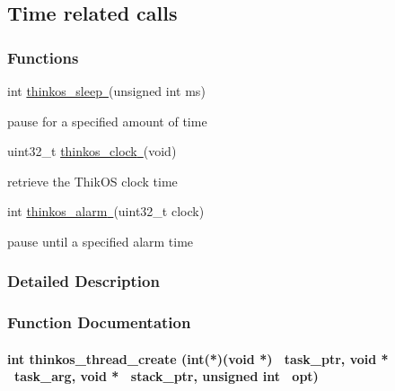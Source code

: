 \subsection{\texorpdfstring{{Time related
calls}}{Time related calls}}\label{h.fj4n6rp8qwm7}

\subsubsection{\texorpdfstring{{Functions}}{Functions}}\label{h.iqcme3p75udy}

{int
}{\protect\hyperlink{h.26in1rg}{thinkos\_sleep}}{\protect\hyperlink{h.26in1rg}{~}}{(unsigned
int ms)}

{pause for a specified amount of time }

{uint32\_t
}{\protect\hyperlink{h.lnxbz9}{thinkos\_clock}}{\protect\hyperlink{h.lnxbz9}{~}}{(void)}

{retrieve the ThikOS clock time }

{int
}{\protect\hyperlink{h.35nkun2}{thinkos\_alarm}}{\protect\hyperlink{h.35nkun2}{~}}{(uint32\_t
clock)}

{pause until a specified alarm time }

{}

{}

\subsubsection{\texorpdfstring{{Detailed
Description}}{Detailed Description}}\label{detailed-description}

{}

{}

\subsubsection{\texorpdfstring{{Function
Documentation}}{Function Documentation}}\label{function-documentation}

\paragraph{\texorpdfstring{{int thinkos\_thread\_create (int(*)(void *)
~task\_ptr, void * ~task\_arg, void * ~stack\_ptr, unsigned int
~opt)}}{int thinkos\_thread\_create (int(*)(void *) ~task\_ptr, void * ~task\_arg, void * ~stack\_ptr, unsigned int ~opt)}}\label{int-thinkos_thread_create-intvoid-task_ptr-void-task_arg-void-stack_ptr-unsigned-int-opt}

{}

